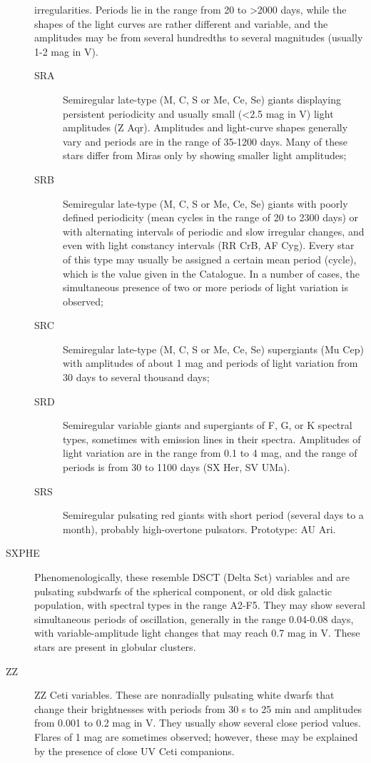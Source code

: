 \begin{description}
				irregularities. Periods lie in the range from 20 to \textgreater{}2000
				days, while the shapes of the light curves are rather different and
				variable, and the amplitudes may be from several hundredths to several
				magnitudes (usually 1-2 mag in V).
	\begin{description}
\item[SRA]		Semiregular late-type (M, C, S or Me, Ce, Se) giants
				displaying persistent periodicity and usually small (\textless{}2.5 mag
				in V) light amplitudes (Z Aqr). Amplitudes and light-curve shapes
				generally vary and periods are in the range of 35-1200 days. Many of
				these stars differ from Miras only by showing smaller light
				amplitudes;
\item[SRB]		Semiregular late-type (M, C, S or Me, Ce, Se) giants with
				poorly defined periodicity (mean cycles in the range of 20 to 2300 days)
				or with alternating intervals of periodic and slow irregular changes,
				and even with light constancy intervals (RR CrB, AF Cyg). Every star of
				this type may usually be assigned a certain mean period (cycle), which
				is the value given in the Catalogue. In a number of cases, the
				simultaneous presence of two or more periods of light variation is
				observed;
\item[SRC]		Semiregular late-type (M, C, S or Me, Ce, Se) supergiants
				(Mu Cep) with amplitudes of about 1 mag and periods of light variation
				from 30 days to several thousand days;
\item[SRD]		Semiregular variable giants and supergiants of F, G, or K
				spectral types, sometimes with emission lines in their spectra.
				Amplitudes of light variation are in the range from 0.1 to 4 mag, and
				the range of periods is from 30 to 1100 days (SX Her, SV UMa).
\item[SRS]      Semiregular pulsating red giants with short period
                (several days to a month), probably high-overtone pulsators. Prototype: AU Ari.
	\end{description}
\item[SXPHE] 	Phenomenologically, these resemble DSCT (Delta Sct)
				variables and are pulsating subdwarfs of the spherical component, or old
				disk galactic population, with spectral types in the range A2-F5. They
				may show several simultaneous periods of oscillation, generally in the
				range 0.04-0.08 days, with variable-amplitude light changes that may
				reach 0.7 mag in V. These stars are present in globular clusters.
\item[ZZ]		ZZ Ceti variables. These are nonradially pulsating white
				dwarfs that change their brightnesses with periods from 30 s to 25 min
				and amplitudes from 0.001 to 0.2 mag in V. They usually show several
				close period values. Flares of 1 mag are sometimes observed; however,
				these may be explained by the presence of close UV Ceti companions.
	

\end{description}
